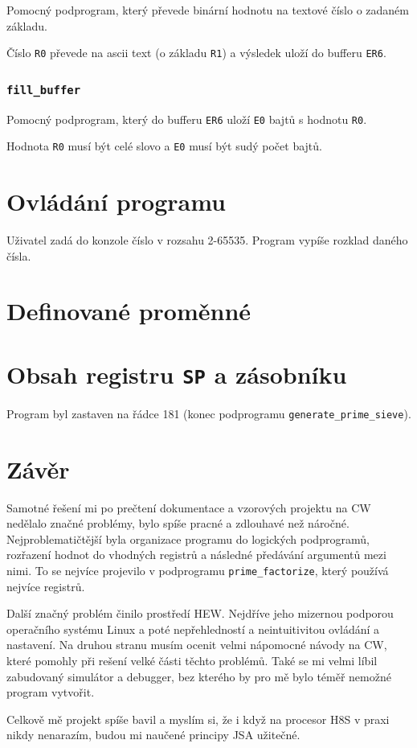 \documentclass[12pt]{article}
\newcommand{\code}[1]{\mbox{\texttt{#1}}}
\begin{document}
Pomocný podprogram, který převede binární hodnotu na textové číslo o zadaném základu.

Číslo \code{R0} převede na ascii text (o základu \code{R1}) a výsledek uloží do bufferu \code{ER6}.

\subsubsection{\code{fill\_buffer}}

Pomocný podprogram, který do bufferu \code{ER6} uloží \code{E0} bajtů s hodnotu \code{R0}.

Hodnota \code{R0} musí být celé slovo a \code{E0} musí být sudý počet bajtů.

\section{Ovládání programu}

Uživatel zadá do konzole číslo v rozsahu 2-65535. Program vypíše rozklad daného čísla.

\section{Definované proměnné}


\section{Obsah registru \code{SP} a zásobníku}

Program byl zastaven na řádce 181 (konec podprogramu \code{generate\_prime\_sieve}).


\section{Závěr}

Samotné řešení mi po prečtení dokumentace a vzorových projektu na CW nedělalo značné problémy, bylo
spíše pracné a zdlouhavé než náročné. Nejproblematičtější byla organizace programu do logických
podprogramů, rozřazení hodnot do vhodných registrů a následné předávání argumentů mezi nimi. To se
nejvíce projevilo v podprogramu \code{prime\_factorize}, který používá nejvíce registrů.

Další značný problém činilo prostředí HEW. Nejdříve jeho mizernou podporou operačního systému Linux
a poté nepřehledností a neintuitivitou ovládání a nastavení. Na druhou stranu musím ocenit velmi
nápomocné návody na CW, které pomohly při rešení velké části těchto problémů. Také se mi velmi
líbil zabudovaný simulátor a debugger, bez kterého by pro mě bylo téměř nemožné program vytvořit.

Celkově mě projekt spíše bavil a myslím si, že i když na procesor H8S v praxi nikdy nenarazím,
budou mi naučené principy JSA užitečné.
\end{document}
